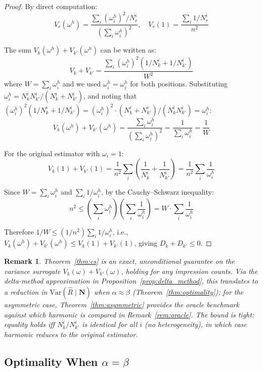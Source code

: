 \documentclass[sigconf]{acmart}
\newtheorem{remark}{Remark}
\begin{document}
\begin{proof}
By direct computation:
\[
V_r(\omega^h) = \frac{\sum_i (\omega_i^h)^2 / N_r^i}{(\sum_i \omega_i^h)^2}, \quad V_r(1) = \frac{\sum_i 1/N_r^i}{n^2}
\]

The sum $V_k(\omega^h) + V_{k'}(\omega^h)$ can be written as:
\[
V_k + V_{k'} = \frac{\sum_i (\omega_i^h)^2 (1/N_k^i + 1/N_{k'}^i)}{W^2}
\]
where $W = \sum_i \omega_i^h$ and we used $\omega_i^h = \omega^h_i$ for both positions. Substituting $\omega_i^h = N_k^i N_{k'}^i / (N_k^i + N_{k'}^i)$, and noting that $(\omega_i^h)^2 (1/N_k^i + 1/N_{k'}^i) = (\omega_i^h)^2 \cdot (N_k^i + N_{k'}^i)/(N_k^i N_{k'}^i) = \omega_i^h$:
\[
V_k(\omega^h) + V_{k'}(\omega^h) = \frac{\sum_i \omega_i^h}{(\sum_i \omega_i^h)^2} = \frac{1}{\sum_i \omega_i^h} = \frac{1}{W}
\]

For the original estimator with $\omega_i = 1$:
\[
V_k(1) + V_{k'}(1) = \frac{1}{n^2}\sum_i \left(\frac{1}{N_k^i} + \frac{1}{N_{k'}^i}\right) = \frac{1}{n^2}\sum_i \frac{1}{\omega_i^h}
\]

Since $W = \sum_i \omega_i^h$ and $\sum_i 1/\omega_i^h$, by the Cauchy–Schwarz inequality:
\[
n^2 \leq \left(\sum_i \omega_i^h\right)\left(\sum_i \frac{1}{\omega_i^h}\right) = W \cdot \sum_i \frac{1}{\omega_i^h}
\]

Therefore $1/W \leq (1/n^2)\sum_i 1/\omega_i^h$, i.e., $V_k(\omega^h) + V_{k'}(\omega^h) \leq V_k(1) + V_{k'}(1)$, giving $D_k + D_{k'} \leq 0$.
\end{proof}

\begin{remark}
Theorem~\ref{thm:cs} is an exact, unconditional guarantee on the variance surrogate $V_k(\omega)+V_{k'}(\omega)$, holding for any impression counts. Via the delta-method approximation in Proposition~\ref{prop:delta_method}, this translates to a reduction in $\mathrm{Var}(\hat{R}\mid\mathbf{N})$ when $\alpha\approx\beta$ (Theorem~\ref{thm:optimality}); for the asymmetric case, Theorem~\ref{thm:asymmetric} provides the oracle benchmark against which harmonic is compared in Remark~\ref{rem:oracle}. The bound is tight: equality holds iff $N_k^i / N_{k'}^i$ is identical for all $i$ (no heterogeneity), in which case harmonic reduces to the original estimator.
\end{remark}

\subsection{Optimality When $\alpha = \beta$}
\end{document}
